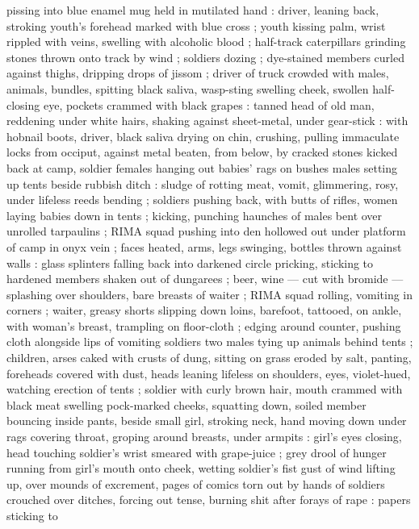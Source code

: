 pissing into blue enamel mug held in mutilated hand : driver, leaning back, stroking youth's
forehead marked with blue cross ; youth kissing palm, wrist rippled with veins, swelling with
alcoholic blood ; half-track caterpillars grinding stones thrown onto track by wind ; soldiers
dozing ; dye-stained members curled against thighs, dripping drops of jissom ; driver of truck
crowded with males, animals, bundles, spitting black saliva, wasp-sting swelling cheek, swollen
half-closing eye, pockets crammed with black grapes : tanned head of old man, reddening under white
hairs, shaking against sheet-metal, under gear-stick : with hobnail boots, driver, black saliva
drying on chin, crushing, pulling immaculate locks from occiput, against metal beaten, from below,
by cracked stones kicked back {\semislash} at camp, soldier 
{\semislash} females hanging out babies' rags on bushes {\semislash} males setting up tents beside
rubbish ditch : sludge of rotting meat, vomit, glimmering, rosy, under lifeless reeds bending ;
soldiers pushing back, with butts of rifles, women laying babies down in tents ; kicking, punching
haunches of males bent over unrolled tarpaulins ; RIMA squad pushing into den hollowed out under
platform of camp in onyx vein ; faces heated, arms, legs swinging, bottles thrown against walls :
glass splinters falling back into darkened circle pricking, sticking to hardened members shaken out
of dungarees ; beer, wine --- cut with bromide %
--- splashing over shoulders, bare breasts of waiter ; RIMA squad rolling, vomiting in corners ;
waiter, greasy shorts slipping down loins, barefoot, tattooed, on ankle, with woman's breast,
trampling on floor-cloth ; edging around counter, pushing cloth alongside lips of vomiting soldiers
{\semislash} two males tying up animals behind tents ; children, arses caked with crusts of dung,
sitting on grass eroded by salt, panting, foreheads covered with dust, heads leaning lifeless on
shoulders, eyes, violet-hued, watching erection of tents ; soldier with curly brown hair, mouth
crammed with black meat swelling pock-marked cheeks, squatting down, soiled member bouncing inside
pants, beside small girl, stroking neck, hand moving down under rags covering throat, groping around
breasts, under armpits : girl's eyes closing, head touching soldier's wrist smeared with grape-juice
; grey drool of hunger running from girl's mouth onto cheek, wetting soldier's fist {\semislash}
gust of wind lifting up, over mounds of excrement, pages of comics torn out by hands of soldiers
crouched over ditches, forcing out tense, burning shit after forays of rape : papers sticking to
